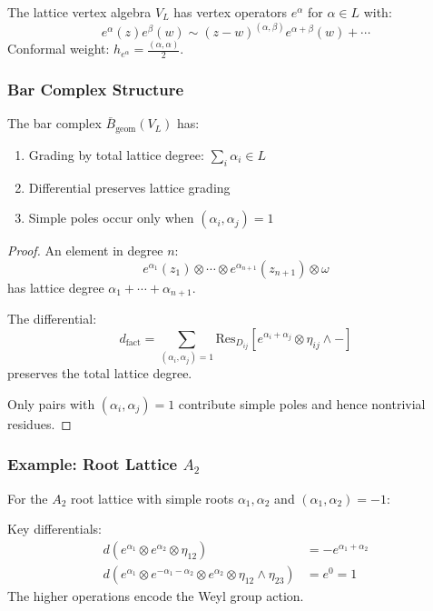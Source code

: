 \begin{definition}
The lattice vertex algebra $V_L$ has vertex operators $e^\alpha$ for $\alpha \in L$ with:
\[
e^\alpha(z)e^\beta(w) \sim (z-w)^{(\alpha,\beta)} e^{\alpha+\beta}(w) + \cdots
\]
Conformal weight: $h_{e^\alpha} = \frac{(\alpha,\alpha)}{2}$.
\end{definition}
 
\subsubsection{Bar Complex Structure}
 
\begin{theorem}
The bar complex $\bar{B}_{\text{geom}}(V_L)$ has:
\begin{enumerate}
\item Grading by total lattice degree: $\sum_i \alpha_i \in L$
\item Differential preserves lattice grading
\item Simple poles occur only when $(\alpha_i, \alpha_j) = 1$
\end{enumerate}
\end{theorem}
 
\begin{proof}
An element in degree $n$:
\[
e^{\alpha_1}(z_1) \otimes \cdots \otimes e^{\alpha_{n+1}}(z_{n+1}) \otimes \omega
\]
has lattice degree $\alpha_1 + \cdots + \alpha_{n+1}$.
 
The differential:
\[
d_{\text{fact}} = \sum_{(\alpha_i,\alpha_j)=1} \text{Res}_{D_{ij}}\left[e^{\alpha_i+\alpha_j} \otimes \eta_{ij} \wedge -\right]
\]
preserves the total lattice degree.
 
Only pairs with $(\alpha_i, \alpha_j) = 1$ contribute simple poles and hence nontrivial residues.
\end{proof}
 
\subsubsection{Example: Root Lattice $A_2$}
 
For the $A_2$ root lattice with simple roots $\alpha_1, \alpha_2$ and $(\alpha_1, \alpha_2) = -1$:
 
\begin{proposition}
Key differentials:
\begin{align}
d(e^{\alpha_1} \otimes e^{\alpha_2} \otimes \eta_{12}) &= -e^{\alpha_1+\alpha_2} \\
d(e^{\alpha_1} \otimes e^{-\alpha_1-\alpha_2} \otimes e^{\alpha_2} \otimes \eta_{12} \wedge \eta_{23}) &= e^0 = 1
\end{align}
The higher operations encode the Weyl group action.
\end{proposition}
 
